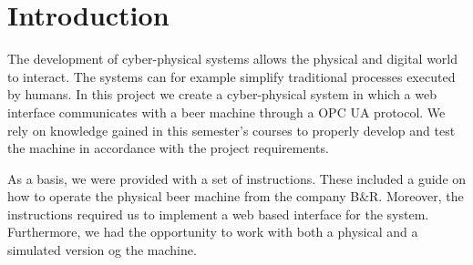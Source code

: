 \section{Introduction}

The development of cyber-physical systems allows the physical and digital world to interact. 
The systems can for example simplify traditional processes executed by humans. 
In this project we create a cyber-physical system in which a web interface communicates with a beer machine through a OPC UA protocol. 
We rely on knowledge gained in this semester's courses to properly develop and test the machine in accordance with the project requirements.

As a basis, we were provided with a set of instructions. These included a guide on how to operate the physical beer machine from the company B\&R. 
Moreover, the instructions required us to implement a web based interface for the system. 
Furthermore, we had the opportunity to work with both a physical and a simulated version og the machine.